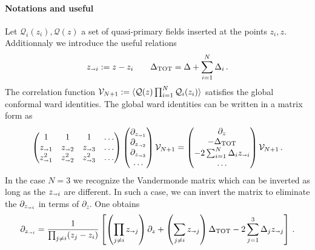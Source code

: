 \documentclass[a4paper]{article}
\begin{document}
\paragraph{Notations and useful}
Let $\mathcal{Q}_i(z_i),\mathcal{Q}(z)$ a set of quasi-primary fields inserted at the points $z_i,z$. Additionnaly we introduce the useful relations 
\begin{equation}
  z_{\shortrightarrow i} :=z-z_i \qquad \Delta_{\rm TOT} = \Delta + \sum_{i=1}^{N} \Delta_i\,.
\end{equation}
The correlation function $\mathcal{V}_{N+1}:=\braket{\mathcal{Q}(z)\prod_{i=1}^{N}\mathcal{Q}_i(z_i)}$ satisfies the global conformal ward identities. The global ward identities can be written in a matrix form as
\begin{equation}
  \begin{pmatrix}
  1 & 1 & 1 & \dots \\
  z_{\shortrightarrow 1} & z_{\shortrightarrow 2} & z_{\shortrightarrow 3} & \dots \\
  z_{\shortrightarrow 1}^2 & z_{\shortrightarrow 2}^2 & z_{\shortrightarrow 3}^2 & \dots \\
  \end{pmatrix}
  \begin{pmatrix}
    \partial_{z_{\shortrightarrow 1}} \\
    \partial_{z_{\shortrightarrow 2}} \\
    \partial_{z_{\shortrightarrow 3}} \\
    \dots
  \end{pmatrix}
  \mathcal{V}_{N+1}
  = \begin{pmatrix}
    \partial_z \\
    -\Delta_{\rm TOT} \\
    -2\sum_{i=1}^N \Delta_i z_{\shortrightarrow i} \\
    \dots
  \end{pmatrix}
  \mathcal{V}_{N+1}
  \,.
\end{equation}
In the case $N=3$ we recognize the Vandermonde matrix which can be inverted as long as the $z_{\shortrightarrow i}$ are different. In such a case, we can invert the matrix to eliminate the $ \partial_{z_{\shortrightarrow i}}$ in terms of $\partial_z$. One obtains
\begin{equation}
  \partial_{z_{\shortrightarrow i}}=\frac{1}{\prod_{j\neq i} (z_j-z_i)}\left[\left(\prod_{j \neq i }z_{\shortrightarrow j}\right)\partial_z +\left(\sum_{j\neq i}z_{\shortrightarrow j}\right)\Delta_{\rm TOT}-2\sum_{j=1}^{3}\Delta_j z_{\shortrightarrow j}\right]\,.
\end{equation}
\end{document}
